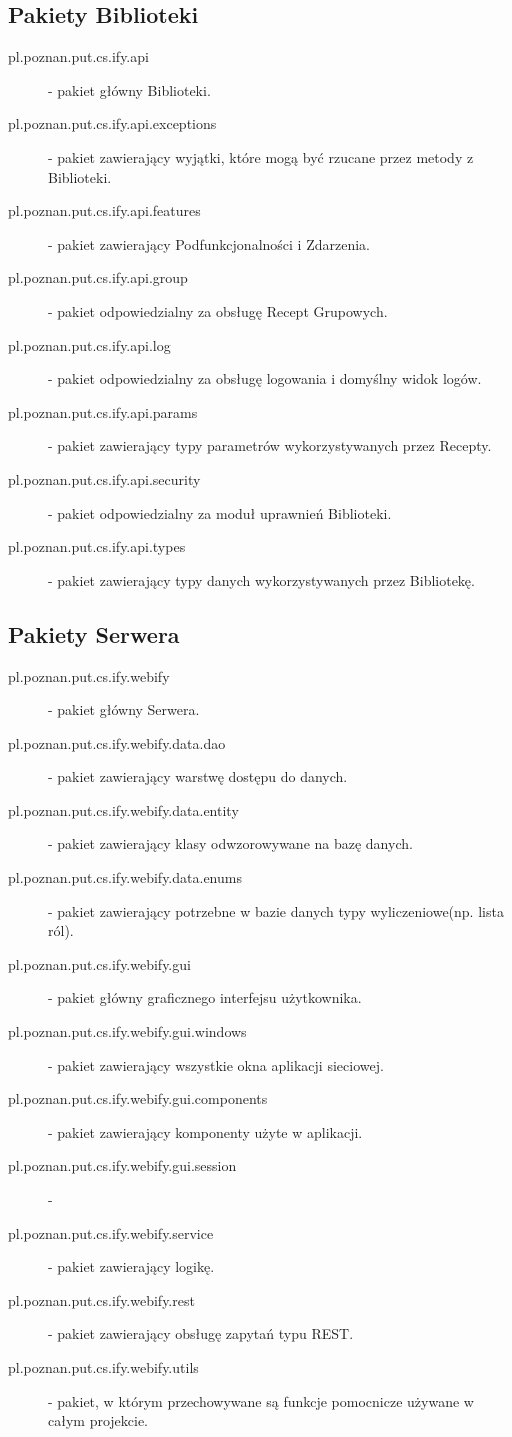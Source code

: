 \documentclass[11pt,a4paper,polish,thesis]{dcsbook}
\begin{document}
\subsection{Pakiety Biblioteki}
\begin{description}
\item[pl.poznan.put.cs.ify.api] - pakiet główny Biblioteki.
\item[pl.poznan.put.cs.ify.api.exceptions] - pakiet zawierający wyjątki, które mogą być rzucane przez metody z Biblioteki.
\item[pl.poznan.put.cs.ify.api.features] - pakiet zawierający Podfunkcjonalności i Zdarzenia.
\item[pl.poznan.put.cs.ify.api.group] - pakiet odpowiedzialny za obsługę Recept Grupowych.
\item[pl.poznan.put.cs.ify.api.log] - pakiet odpowiedzialny za obsługę logowania i domyślny widok logów.
\item[pl.poznan.put.cs.ify.api.params] - pakiet zawierający typy parametrów wykorzystywanych przez Recepty.
\item[pl.poznan.put.cs.ify.api.security] - pakiet odpowiedzialny za moduł uprawnień Biblioteki.
\item[pl.poznan.put.cs.ify.api.types] - pakiet zawierający typy danych wykorzystywanych przez Bibliotekę.
\end{description}
\subsection{Pakiety Serwera}
\begin{description}
\item[pl.poznan.put.cs.ify.webify] - pakiet główny Serwera.
\item[pl.poznan.put.cs.ify.webify.data.dao] - pakiet zawierający warstwę dostępu do danych.
\item[pl.poznan.put.cs.ify.webify.data.entity] - pakiet zawierający klasy odwzorowywane na bazę danych.
\item[pl.poznan.put.cs.ify.webify.data.enums] - pakiet zawierający potrzebne w bazie danych typy wyliczeniowe(np. lista ról). 
\item[pl.poznan.put.cs.ify.webify.gui] - pakiet główny graficznego interfejsu użytkownika.
\item[pl.poznan.put.cs.ify.webify.gui.windows] - pakiet zawierający wszystkie okna aplikacji sieciowej.
\item[pl.poznan.put.cs.ify.webify.gui.components] - pakiet zawierający komponenty użyte w aplikacji.
\item[pl.poznan.put.cs.ify.webify.gui.session] - 
\item[pl.poznan.put.cs.ify.webify.service] - pakiet zawierający logikę.
\item[pl.poznan.put.cs.ify.webify.rest] - pakiet zawierający obsługę zapytań typu REST.
\item[pl.poznan.put.cs.ify.webify.utils] - pakiet, w którym przechowywane są funkcje pomocnicze używane w całym projekcie.
\end{description}
\end{document}
